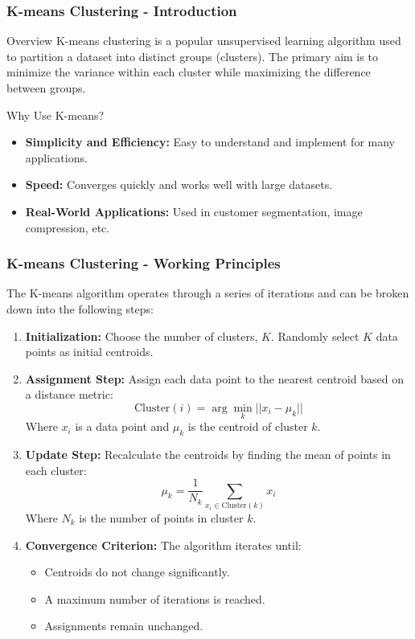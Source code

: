 \documentclass[aspectratio=169]{beamer}
\begin{document}
\begin{frame}[fragile]
    \frametitle{K-means Clustering - Introduction}
    \begin{block}{Overview}
        K-means clustering is a popular unsupervised learning algorithm used to partition a dataset into distinct groups (clusters).
        The primary aim is to minimize the variance within each cluster while maximizing the difference between groups.
    \end{block}
    
    \begin{block}{Why Use K-means?}
        \begin{itemize}
            \item \textbf{Simplicity and Efficiency:} Easy to understand and implement for many applications.
            \item \textbf{Speed:} Converges quickly and works well with large datasets.
            \item \textbf{Real-World Applications:} Used in customer segmentation, image compression, etc.
        \end{itemize}
    \end{block}
\end{frame}

\begin{frame}[fragile]
    \frametitle{K-means Clustering - Working Principles}
    The K-means algorithm operates through a series of iterations and can be broken down into the following steps:

    \begin{enumerate}
        \item \textbf{Initialization:} Choose the number of clusters, \(K\). Randomly select \(K\) data points as initial centroids.
        \item \textbf{Assignment Step:} Assign each data point to the nearest centroid based on a distance metric:
            \begin{equation}
                \text{Cluster}(i) = \arg\min_{k} || x_i - \mu_k ||
            \end{equation}
            Where \(x_i\) is a data point and \(\mu_k\) is the centroid of cluster \(k\).
        \item \textbf{Update Step:} Recalculate the centroids by finding the mean of points in each cluster:
            \begin{equation}
                \mu_k = \frac{1}{N_k} \sum_{x_i \in \text{Cluster}(k)} x_i
            \end{equation}
            Where \(N_k\) is the number of points in cluster \(k\).
        \item \textbf{Convergence Criterion:} The algorithm iterates until:
            \begin{itemize}
                \item Centroids do not change significantly.
                \item A maximum number of iterations is reached.
                \item Assignments remain unchanged.
            \end{itemize}
    \end{enumerate}
\end{frame}
\end{document}
